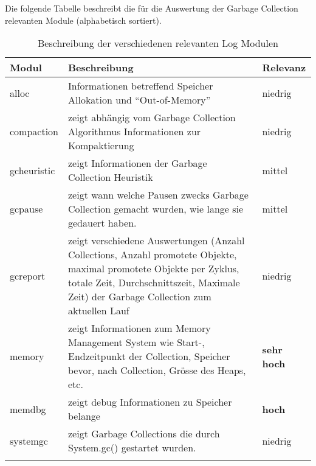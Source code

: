 Die folgende Tabelle beschreibt die für die Auswertung der Garbage Collection relevanten Module (alphabetisch sortiert). 

\begin{longtable}{|p{4cm}|p{9cm}|p{2cm}|}
  \hline
  \textbf{Modul} & \textbf{Beschreibung} & \textbf{Relevanz}\\\hline
  alloc & Informationen betreffend Speicher Allokation und ``Out-of-Memory'' & niedrig \\\hline
  compaction & zeigt abhängig vom Garbage Collection Algorithmus Informationen zur Kompaktierung& niedrig \\\hline
  gcheuristic & zeigt Informationen der Garbage Collection Heuristik & mittel \\\hline
  gcpause & zeigt wann welche Pausen zwecks Garbage Collection gemacht wurden, wie lange sie gedauert haben. & mittel \\\hline
  gcreport & zeigt verschiedene Auswertungen (Anzahl Collections, Anzahl promotete Objekte, maximal promotete Objekte per Zyklus, totale Zeit, Durchschnittszeit, Maximale Zeit) der Garbage Collection zum aktuellen Lauf& niedrig \\\hline
  memory & zeigt Informationen zum Memory Management System wie Start-, Endzeitpunkt der Collection, Speicher bevor, nach Collection, Grösse des Heaps, etc.& \textbf{sehr hoch} \\\hline
  memdbg & zeigt debug Informationen zu Speicher belange& \textbf{hoch} \\\hline
  systemgc & zeigt Garbage Collections die durch System.gc() gestartet wurden. & niedrig \\\hline
    \caption{Beschreibung der verschiedenen relevanten Log Modulen}
\end{longtable}